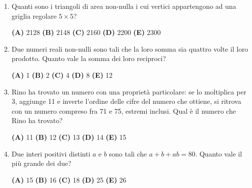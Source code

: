 \documentclass{article}
\begin{document}
\begin{enumerate}
	\item Quanti sono i triangoli di area non-nulla i cui vertici
		appartengono ad una griglia regolare $5\times 5$?

		\vspace{0.15cm}
		\textbf{(A)} 2128 \hspace{0.5cm}
		\textbf{(B)} 2148 \hspace{0.5cm}
		\textbf{(C)} 2160 \hspace{0.5cm}
		\textbf{(D)} 2200 \hspace{0.5cm}
		\textbf{(E)} 2300 \hspace{0.5cm}

	\item Due numeri reali non-nulli sono tali che la loro somma
		sia quattro volte il loro prodotto. Quanto vale la somma dei
		loro reciproci?

		\vspace{0.15cm}
		\textbf{(A)} 1 \hspace{0.5cm}
		\textbf{(B)} 2 \hspace{0.5cm}
		\textbf{(C)} 4 \hspace{0.5cm}
		\textbf{(D)} 8 \hspace{0.5cm}
		\textbf{(E)} 12 \hspace{0.5cm}

	\item Rino ha trovato un numero con una proprietà particolare: se
		lo moltiplica per
		3, aggiunge 11 e inverte l'ordine delle cifre del
		numero che ottiene, si ritrova con un numero compreso fra
		71 e 75, estremi inclusi. Qual è il numero che Rino ha trovato?

		\vspace{0.15cm}
		\textbf{(A)} 11 \hspace{0.5cm}
		\textbf{(B)} 12 \hspace{0.5cm}
		\textbf{(C)} 13 \hspace{0.5cm}
		\textbf{(D)} 14 \hspace{0.5cm}
		\textbf{(E)} 15 \hspace{0.5cm}

	\item Due interi positivi distinti $a$ e $b$ sono tali che $a+b+ab=80$.
		Quanto vale il più grande dei due?

		\vspace{0.15cm}
		\textbf{(A)} 15 \hspace{0.5cm}
		\textbf{(B)} 16 \hspace{0.5cm}
		\textbf{(C)} 18 \hspace{0.5cm}
		\textbf{(D)} 25 \hspace{0.5cm}
		\textbf{(E)} 26 \hspace{0.5cm}


\end{enumerate}
\end{document}
